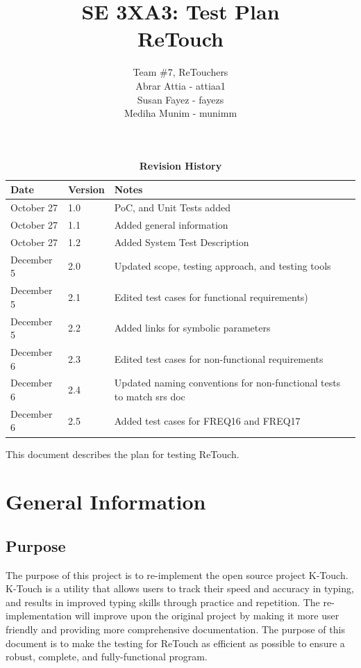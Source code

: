 \documentclass[12pt, titlepage]{article}
\title{SE 3XA3: Test Plan\\ReTouch}
\author{Team \#7, ReTouchers
		\\ Abrar Attia - attiaa1
		\\ Susan Fayez - fayezs
		\\ Mediha Munim - munimm
}
\begin{document}
\maketitle

\tableofcontents
\listoftables
\listoffigures

\begin{table}[htp]
\caption{\bf Revision History}
\begin{tabularx}{\textwidth}{p{3cm}p{2cm}X}
\toprule {\bf Date} & {\bf Version} & {\bf Notes}\\
\midrule
October 27 & 1.0 & PoC, and Unit Tests added\\
October 27 & 1.1 & Added general information\\
October 27 & 1.2 & Added System Test Description\\
December 5 & 2.0 & Updated scope, testing approach, and testing tools\\
December 5 & 2.1 & Edited test cases for functional  requirements)\\
December 5 & 2.2 & Added links for symbolic parameters\\
December 6 & 2.3 & Edited test cases for non-functional requirements\\
December 6 & 2.4 & Updated naming conventions for non-functional tests to match srs doc\\
December 6 & 2.5 & Added test cases for FREQ16 and FREQ17\\

\bottomrule
\end{tabularx}
\end{table}
\newpage


This document describes the plan for testing ReTouch.

\section{General Information}

\subsection{Purpose}

	The purpose of this project is to re-implement the open source project K-Touch. K-Touch is a utility that allows users to track their speed and accuracy in typing, and results in improved typing skills through practice and repetition. The re-implementation will improve upon the original project by making it more user friendly and providing more comprehensive documentation. The purpose of this document is to make the testing for ReTouch as efficient as possible to ensure a robust, complete, and fully-functional program.
\end{document}
